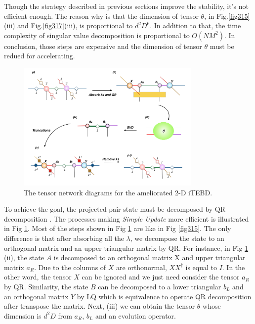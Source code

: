 Though the strategy described in previous sections improve the stability, it's not efficient enough. The reason why is that the dimension of tensor $\theta$, in Fig.\ref{fig315}(iii) and Fig.\ref{fig317}(iii), is proportional to $d^2D^6$. In addition to that, the time complexity of singular value decomposition is proportional to $O(NM^2)$. In conclusion, those steps are expensive and the dimension of tensor $\theta$ must be redued for accelerating. 
\label{2doptQR} \begin{figure}[H] \centering \includegraphics[width=0.80\textwidth]{figures/fig318.png} \caption[The tensor network diagrams for the ameliorated 2-D iTEBD with QR decompositiont]{The tensor network diagrams for the ameliorated 2-D iTEBD.} \label{fig318} \end{figure} To achieve the goal, the projected pair state must be decomposed by QR decomposition \cite{li_efficient_2012} \cite{yang_accelerated_2007}. The processes making \textit{Simple Update} more efficient is illustrated in Fig \ref{fig318}.  Most of the steps shown in Fig \ref{fig318} are like in Fig \ref{fig315}. The only difference is that after absorbing all the $\lambda$, we decompose the state to an orthogonal matrix and an upper triangular matrix by QR. For instance, in Fig \ref{fig318} (ii), the state $A$ is decomposed to an orthogonal matrix X and upper triangular matrix $a_R$. Due to the columns of $X$ are orthonormal, $XX^{\dagger}$ is equal to $I$. In the other word, the tensor $X$ can be ignored and we just need consider the tensor $a_R$ by QR. Similarity, the state $B$ can be decomposed to a lower triangular $b_L$ and an orthogonal matrix $Y$ by LQ which is equivalence to operate QR decomposition after transpose the matrix. Next, (iii) we can obtain the tensor $\theta$ whose dimension is $d^2D$ from $a_R$, $b_L$ and an evolution operator.

